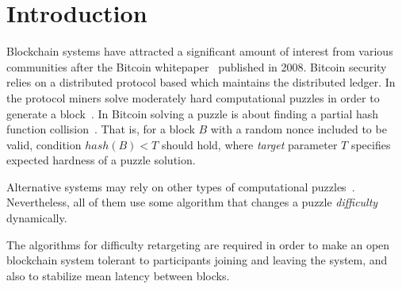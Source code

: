 \documentclass[]{llncs}
\begin{document}
\section{Introduction}
\label{sec:intro}

Blockchain systems have attracted a significant amount of interest from various communities after the Bitcoin whitepaper~\cite{Nakamoto2008} published in 2008.
Bitcoin security relies on a distributed protocol based which maintains the distributed ledger. In the protocol miners solve moderately hard computational puzzles in order to generate a block~\cite{}. In Bitcoin solving a puzzle is about finding a partial hash function collision~\cite{}. That is, for a block $B$ with a random nonce included to be valid, condition $hash(B) < T$ should hold, where {\em target} parameter $T$ specifies expected hardness of a puzzle solution.

Alternative systems may rely on other types of computational puzzles~\cite{??}. Nevertheless, all of them use some algorithm that changes a puzzle {\em difficulty} dynamically.

The algorithms for difficulty retargeting are required in order to make an open blockchain system tolerant to participants joining and leaving the system, and also to stabilize mean latency between blocks. 



\end{document}
